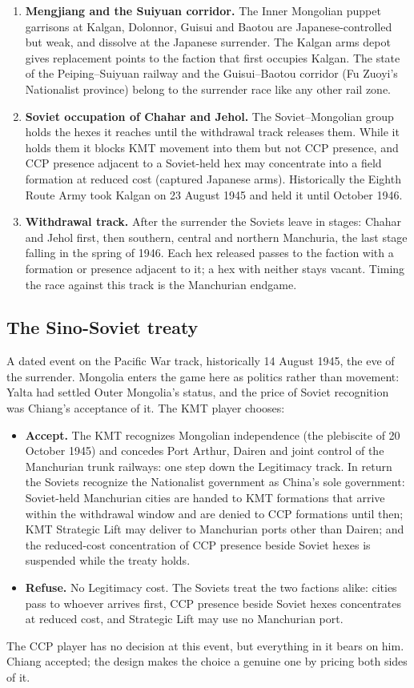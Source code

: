 \documentclass[11pt]{article}
\begin{document}
\begin{enumerate}
\item \textbf{Mengjiang and the Suiyuan corridor.} The Inner Mongolian puppet garrisons at Kalgan, Dolonnor, Guisui and Baotou are Japanese-controlled but weak, and dissolve at the Japanese surrender. The Kalgan arms depot gives replacement points to the faction that first occupies Kalgan. The state of the Peiping--Suiyuan railway and the Guisui--Baotou corridor (Fu Zuoyi's Nationalist province) belong to the surrender race like any other rail zone.
\item \textbf{Soviet occupation of Chahar and Jehol.} The Soviet--Mongolian group holds the hexes it reaches until the withdrawal track releases them. While it holds them it blocks KMT movement into them but not CCP presence, and CCP presence adjacent to a Soviet-held hex may concentrate into a field formation at reduced cost (captured Japanese arms). Historically the Eighth Route Army took Kalgan on 23 August 1945 and held it until October 1946.
\item \textbf{Withdrawal track.} After the surrender the Soviets leave in stages: Chahar and Jehol first, then southern, central and northern Manchuria, the last stage falling in the spring of 1946. Each hex released passes to the faction with a formation or presence adjacent to it; a hex with neither stays vacant. Timing the race against this track is the Manchurian endgame.
\end{enumerate}

\subsection{The Sino-Soviet treaty}
A dated event on the Pacific War track, historically 14 August 1945, the eve of the surrender. Mongolia enters the game here as politics rather than movement: Yalta had settled Outer Mongolia's status, and the price of Soviet recognition was Chiang's acceptance of it. The KMT player chooses:
\begin{itemize}
\item \textbf{Accept.} The KMT recognizes Mongolian independence (the plebiscite of 20 October 1945) and concedes Port Arthur, Dairen and joint control of the Manchurian trunk railways: one step down the Legitimacy track. In return the Soviets recognize the Nationalist government as China's sole government: Soviet-held Manchurian cities are handed to KMT formations that arrive within the withdrawal window and are denied to CCP formations until then; KMT Strategic Lift may deliver to Manchurian ports other than Dairen; and the reduced-cost concentration of CCP presence beside Soviet hexes is suspended while the treaty holds.
\item \textbf{Refuse.} No Legitimacy cost. The Soviets treat the two factions alike: cities pass to whoever arrives first, CCP presence beside Soviet hexes concentrates at reduced cost, and Strategic Lift may use no Manchurian port.
\end{itemize}
The CCP player has no decision at this event, but everything in it bears on him. Chiang accepted; the design makes the choice a genuine one by pricing both sides of it.
\end{document}
